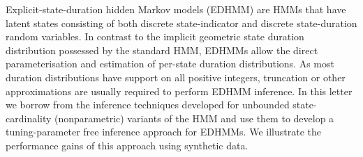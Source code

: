 Explicit-state-duration hidden Markov models (EDHMM) are HMMs that have latent states consisting of both discrete state-indicator and discrete state-duration random variables.  In contrast to the implicit geometric state duration distribution possessed by the standard HMM, EDHMMs allow the direct parameterisation and estimation of per-state duration distributions. As most duration distributions have support on all positive integers, truncation or other approximations are usually required to perform EDHMM inference.  In this letter we borrow from the inference techniques developed for unbounded state-cardinality (nonparametric) variants of the HMM and use them to develop a tuning-parameter free inference approach for EDHMMs.  We illustrate the performance gains of this approach using synthetic data.